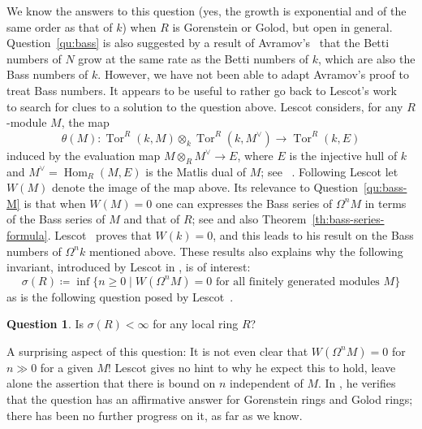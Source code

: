 \documentclass{amsart}
\numberwithin{equation}{section}
\theoremstyle{plain}
\theoremstyle{definition}
\newtheorem{question}[equation]{Question}
\theoremstyle{remark}
\newcommand{\Hom}{\operatorname{Hom}}
\newcommand{\tor}{\operatorname{Tor}}
\begin{document}
We know the answers to this question (yes, the growth is exponential and of the same order as that of $k$) when $R$ is Gorenstein or Golod, but open in general. Question~\ref{qu:bass} is also suggested by a result of Avramov's~\cite{Avramov:1996} that the Betti numbers of $N$ grow at the same rate as the Betti numbers of $k$, which are also the Bass numbers of $k$. However, we have not been able to adapt Avramov's proof to treat Bass numbers.  It appears to be  useful to rather go back to Lescot's work~\cite{Lescot:1986} to search for clues to a solution to the question above.  Lescot considers, for any $R$-module $M$, the map 
\begin{equation*}
\theta(M)\colon  \tor^R(k,M)\otimes_k \tor^R(k,M^\vee)\longrightarrow \tor^R(k,E)
\end{equation*}
induced by the evaluation map $M\otimes_R M^\vee \to E$, where $E$ is the injective hull of $k$ and $M^\vee = \Hom_R(M,E)$ is the Matlis dual of $M$; see ~\cite{Bruns/Herzog:1998a}. Following Lescot let $W(M)$ denote the image of the map above. Its relevance to Question~\ref{qu:bass-M} is that when $W(M)=0$ one can expresses the Bass series of $\Omega^nM$ in terms of the Bass series of $M$ and that of $R$; see \cite{Lescot:1986} and also Theorem~\ref{th:bass-series-formula}. Lescot~\cite{Lescot:1983} proves that $W(k)=0$, and this leads to his result on the Bass numbers of $\Omega^nk$ mentioned above.  These results also explains why the following invariant, introduced by Lescot in \cite{Lescot:1986}, is of interest:
\[
\sigma(R)\coloneqq \inf\{n\ge 0\mid W(\Omega^nM)=0 \text{ for all finitely generated modules $M$}\}
\]
as is the following question posed by Lescot~\cite{Lescot:1986}.

\begin{question}
    Is $\sigma(R)<\infty$ for any local ring $R$?
\end{question}

A surprising aspect of this question: It is not even clear that $W(\Omega^nM)=0$ for $n\gg 0$ for a given $M$! Lescot gives no hint to why he expect this to hold, leave alone the assertion that there is bound on $n$ independent of $M$. In \cite{Lescot:1986}, he verifies that the question has an affirmative answer for Gorenstein rings and Golod rings; there has been no further progress on it, as far as we know.  
\end{document}
